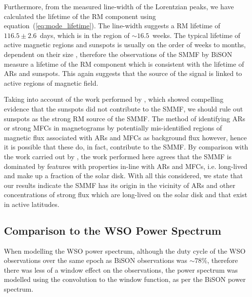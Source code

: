 Furthermore, from the measured line-width of the Lorentzian peaks, we have calculated the lifetime of the RM component using equation~(\ref{eq:mode_lifetime}). The line-width suggests a RM lifetime of $116.5 \pm 2.6$~days, which is in the region of $\sim 16.5$~weeks. The typical lifetime of active magnetic regions and sunspots is usually on the order of weeks to months, dependent on their size \citep{zwaan_solar_1981, schrijver_photospheric_1994, howard_sunspot_2001, hathaway_sunspot_2008, van_driel-gesztelyi_evolution_2015}, therefore the observations of the SMMF by BiSON measure a lifetime of the RM component which is consistent with the lifetime of ARs and sunspots. This again suggests that the source of the signal is linked to active regions of magnetic field.

Taking into account of the work performed by \citet{bose_variability_2018}, which showed compelling evidence that the sunspots did not contribute to the SMMF, we should rule out sunspots as the strong RM source of the SMMF. The method of identifying ARs or strong MFCs in magnetograms by \citet{bose_variability_2018} potentially mis-identified regions of magnetic flux associated with ARs and MFCs as background flux however, hence it is possible that these do, in fact, contribute to the SMMF. By comparison with the work carried out by \citet{kutsenko_contribution_2017}, the work performed here agrees that the SMMF is dominated by features with properties in-line with ARs and MFCs, i.e. long-lived and make up a fraction of the solar disk. With all this considered, we state that our results indicate the SMMF has its origin in the vicinity of ARs and other concentrations of strong flux which are long-lived on the solar disk and that exist in active latitudes.


\subsection{Comparison to the WSO Power Spectrum}\label{sec:WSO_reults}

When modelling the WSO power spectrum, although the duty cycle of the WSO observations over the same epoch as BiSON observations was $\sim 78\%$, therefore there was less of a window effect on the observations, the power spectrum was modelled using the convolution to the window function, as per the BiSON power spectrum.

%

